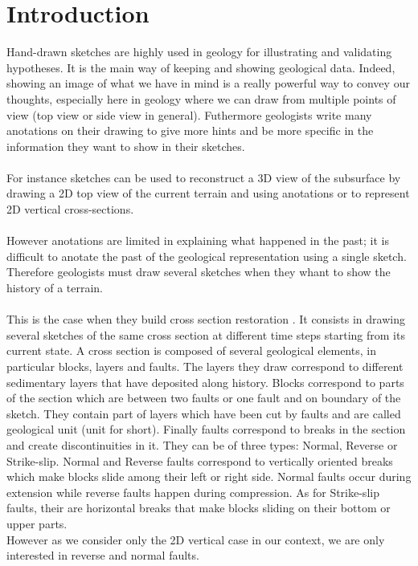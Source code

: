 \documentclass[12pt, a4paper]{report} %
\begin{document}
\chapter{Introduction}
\label{ch:intro}
Hand-drawn sketches are highly used in geology for illustrating and validating hypotheses. It is the main way of keeping and showing geological data. Indeed, showing an image of what we have in mind is a really powerful way to convey our thoughts, especially here in geology where we can draw from multiple points of view (top view or side view in general). Futhermore geologists write many anotations on their drawing to give more hints and be more specific in the information they want to show in their sketches.\\\\
For instance sketches can be used to reconstruct a 3D view of the subsurface by drawing a 2D top view of the current terrain and using anotations \cite{brazil} or to represent 2D vertical cross-sections. \\\\
However anotations are limited in explaining what happened in the past; it is difficult to anotate the past of the geological representation using a single sketch. Therefore geologists must draw several sketches when they whant to show the history of a terrain. \\\\
This is the case when they build cross section restoration \cite{SectionRestoration}. It consists in drawing several sketches of the same cross section at different time steps starting from its current state. A cross section is composed of several geological elements, in particular blocks, layers and faults. The layers they draw correspond to different sedimentary layers that have deposited  along history. Blocks correspond to parts of the section which are between two faults or one fault and on boundary of the sketch. They contain part of layers which have been cut by faults and are called geological unit (unit for short).
Finally faults correspond to breaks in the section and create discontinuities in it. They can be of three types:
Normal, Reverse or Strike-slip. Normal and Reverse faults correspond to vertically oriented breaks which make blocks slide among their left or right side. Normal faults occur during extension while reverse faults happen during compression. As for Strike-slip faults, their are horizontal breaks that make blocks sliding on their bottom or upper parts.\\
However as we consider only the 2D vertical case in our context, we are only interested in reverse and normal faults.\\\\
\end{document}
